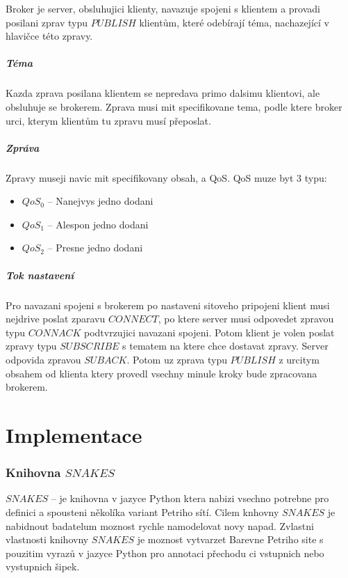Broker je server, obsluhujici klienty, navazuje spojeni s klientem a provadi posilani zprav typu $PUBLISH$ klientům, které odebírají téma, nachazející v hlavičce této zpravy.

\paragraph{Téma}
\label{par:topic}

Kazda zprava posilana klientem se nepredava primo dalsimu klientovi, ale obsluhuje se brokerem. Zprava musi mit specifikovane tema, podle ktere broker urci, kterym klientům tu zpravu musí přeposlat. 

\paragraph{Zpráva}
\label{par:message}

Zpravy museji navic mit specifikovany obsah, a QoS. QoS muze byt 3 typu:
\begin{itemize}
  \item $QoS_0$ -- Nanejvys jedno dodani
  \item $QoS_1$ -- Alespon jedno dodani
  \item $QoS_2$ -- Presne jedno dodani
\end{itemize}

\paragraph{Tok nastavení}

Pro navazani spojeni s brokerem po nastaveni sitoveho pripojeni klient musi nejdrive poslat zparavu $CONNECT$, po ktere server musi odpovedet zpravou typu $CONNACK$ podtvrzujici navazani spojeni. Potom klient je volen poslat zpravy typu $SUBSCRIBE$ s tematem na ktere chce dostavat zpravy. Server odpovida zpravou $SUBACK$. Potom uz zprava typu $PUBLISH$ z urcitym obsahem od klienta ktery provedl vsechny minule kroky bude zpracovana brokerem.


\chapter{Implementace}
\label{sec:implementation}

\subsection{Knihovna $SNAKES$}

\href{https://www.ibisc.univ-evry.fr/~fpommereau/SNAKES/}{$SNAKES$} -- je knihovna v jazyce Python ktera nabizi vsechno potrebne pro definici a spousteni několíka variant Petriho sítí. Cilem knhovny $SNAKES$ je nabidnout badatelum moznost rychle namodelovat novy napad. Zvlastni vlastnosti knihovny $SNAKES$ je moznost vytvarzet Barevne Petriho site s pouzitim vyrazů v jazyce Python pro annotaci přechodu ci vstupnich nebo vystupnich šipek. \cite{snakes}

